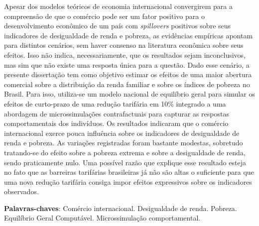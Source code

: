 

\begin{resumo}
	\SingleSpacing
	
	Apesar dos modelos teóricos de economia internacional convergirem para a compreensão de que o comércio pode ser um fator positivo para o desenvolvimento econômico de um país com \textit{spillovers} positivos sobre seus indicadores de desigualdade de renda e pobreza, as evidências empíricas apontam para distintos cenários, sem haver consenso na literatura econômica sobre seus efeitos. Isso não indica, necessariamente, que os resultados sejam inconclusivos, mas sim que não existe uma resposta única para a questão. Dado esse cenário, a presente dissertação tem como objetivo estimar os efeitos de uma maior abertura comercial sobre a distribuição da renda familiar e sobre os índices de pobreza no Brasil. Para isso, utiliza-se um modelo nacional de equilíbrio geral para simular os efeitos de curto-prazo de uma redução tarifária em 10\% integrado a uma abordagem de microssimulações contrafactuais para capturar as respostas comportamentais dos indivíduos. Os resultados indicaram que o comércio internacional exerce pouca influência sobre os indicadores de desigualdade de renda e pobreza. As variações registradas foram bastante modestas, sobretudo tratando-se do efeito sobre a pobreza extrema e sobre a desigualdade de renda, sendo praticamente nulo. Uma possível razão que explique esse resultado esteja no fato que as barreiras tarifárias brasileiras já não são altas o suficiente para que uma nova redução tarifária consiga impor efeitos expressivos sobre os indicadores observados.
	
	\noindent 
	\textbf{Palavras-chaves}: Comércio internacional. Desigualdade de renda. Pobreza. Equilíbrio Geral Computável. Microssimulação comportamental.
\end{resumo}


